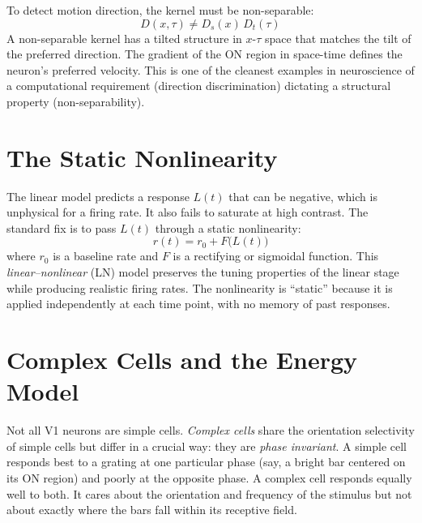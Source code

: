 To detect motion direction, the kernel must be non-separable:
%
\begin{equation}
  D(x, \tau) \neq D_s(x)\,D_t(\tau)
  \label{eq:non-separable}
\end{equation}
%
A non-separable kernel has a tilted structure in $x$-$\tau$ space that matches the tilt of the preferred direction. The gradient of the ON region in space-time defines the neuron's preferred velocity. This is one of the cleanest examples in neuroscience of a computational requirement (direction discrimination) dictating a structural property (non-separability).

\section{The Static Nonlinearity}
\label{sec:static-nonlinearity}

The linear model predicts a response $L(t)$ that can be negative, which is unphysical for a firing rate. It also fails to saturate at high contrast. The standard fix is to pass $L(t)$ through a static nonlinearity:
%
\begin{equation}
  r(t) = r_0 + F\bigl(L(t)\bigr)
  \label{eq:ln-model}
\end{equation}
%
where $r_0$ is a baseline rate and $F$ is a rectifying or sigmoidal function. This \emph{linear--nonlinear} (LN) model preserves the tuning properties of the linear stage while producing realistic firing rates. The nonlinearity is ``static'' because it is applied independently at each time point, with no memory of past responses.

\section{Complex Cells and the Energy Model}
\label{sec:complex-cells}

Not all V1 neurons are simple cells. \emph{Complex cells} share the orientation selectivity of simple cells but differ in a crucial way: they are \emph{phase invariant}. A simple cell responds best to a grating at one particular phase (say, a bright bar centered on its ON region) and poorly at the opposite phase. A complex cell responds equally well to both. It cares about the orientation and frequency of the stimulus but not about exactly where the bars fall within its receptive field.

